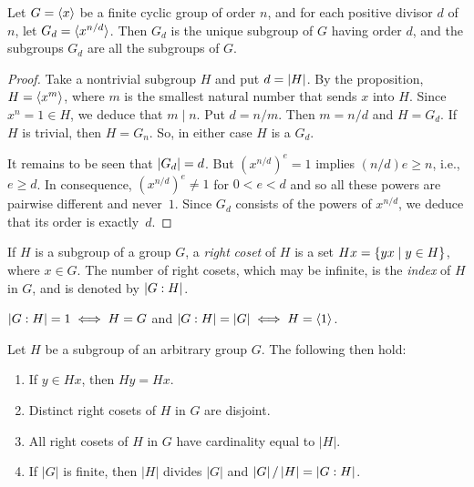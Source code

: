 \begin{cor}\label{cyclic-subgroups}
     Let $G = \langle x\rangle$ be a finite cyclic group of order $n$, and for each positive divisor $d$ of $n$, let $G_d = \langle x^{n/d}\rangle$. Then $G_d$ is the unique subgroup of $G$ having order $d$, and the subgroups $G_d$ are all the subgroups of $G$.
\end{cor}

\begin{proof} Take a nontrivial subgroup $H$ and put $d=\left\vert{H}\right\vert$. By the proposition, $H=\langle x^m\rangle$, where $m$ is the smallest natural number that sends $x$ into $H$. Since $x^n=1\in H$, we deduce that $m\mid n$. Put $d=n/m$. Then $m=n/d$ and $H=G_d$. If $H$ is trivial, then $H=G_n$. So, in either case $H$ is a $G_d$.

It remains to be seen that $\left\vert{G_d}\right\vert=d$. But $(x^{n/d})^e=1$ implies $(n/d)e\ge n$, i.e., $e\ge d$. In consequence, $(x^{n/d})^e\ne1$ for $0< e < d$ and so all these powers are pairwise different and never~$1$. Since $G_d$ consists of the powers of $x^{n/d}$, we deduce that its order is exactly~$d$.  \end{proof}

\begin{defn}\label{right-index}
    If\/ $H$ is a subgroup of a group $G$, a \textsl{right} \textsl{coset} of $H$ is a set $Hx=\{yx\mid y\in H\}$, where $x\in G$. The number of right cosets, which may be infinite, is the \textsl{index} of\/ $H$ in $G$, and is denoted by $\left\vert{G:H}\right\vert$.
\end{defn}

\begin{rem}
    $\left\vert{G:H}\right\vert=1\iff H=G$ and\/ $\left\vert{G:H}\right\vert=\left\vert{G}\right\vert\iff H=\langle1\rangle$.
\end{rem}

\begin{thm}\label{lagrange} {\upshape[Lagrange]}
    Let $H$ be a subgroup of an arbitrary group $G$. The following then hold:
    \begin{enumerate}[\upshape a)]
    \item If\/ $y \in Hx$, then $Hy = Hx$.
    \item Distinct right cosets of\/ $H$ in\/ $G$ are disjoint.
    \item All right cosets of\/ $H$ in $G$ have cardinality equal to $|H|$.
    \item If\/ $|G|$ is finite, then $|H|$ divides $|G|$ and $\left\vert{G}\right\vert/\left\vert{H}\right\vert = \left\vert{G:H}\right\vert$.
    \end{enumerate}
\end{thm}

